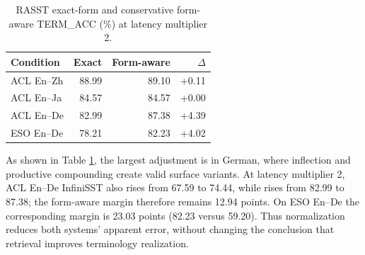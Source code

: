 \begin{table}[t]
\centering
\setlength{\tabcolsep}{3pt}
\begin{tabular}{lrrr}
\toprule
Condition & Exact & Form-aware & $\Delta$ \\
\midrule
ACL En--Zh & 88.99 & 89.10 & +0.11 \\
ACL En--Ja & 84.57 & 84.57 & +0.00 \\
ACL En--De & 82.99 & 87.38 & +4.39 \\
ESO En--De & 78.21 & 82.23 & +4.02 \\
\bottomrule
\end{tabular}
\caption{RASST exact-form and conservative form-aware TERM\_ACC (\%) at latency multiplier 2.}
\label{tab:form_aware}
\end{table}


As shown in Table \ref{tab:form_aware}, the largest adjustment is in German, where inflection and productive compounding create valid surface variants. At latency multiplier 2, ACL En--De InfiniSST also rises from 67.59 to 74.44, while \method rises from 82.99 to 87.38; the form-aware margin therefore remains 12.94 points. On ESO En--De the corresponding margin is 23.03 points (82.23 versus 59.20). Thus normalization reduces both systems' apparent error, without changing the conclusion that retrieval improves terminology realization.


